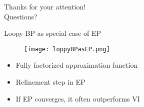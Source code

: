 \documentclass{beamer}
\begin{document}
\begin{frame}{}
	\centering
	Thanks for your attention!\\
	Questions?
\end{frame}

\begin{frame}{Loopy BP as special case of EP}
	\begin{figure}[h]
		\begin{center}
			\texttt{[image: loppyBPasEP.png]}
		\end{center}
	\end{figure}
	\begin{itemize}[<+->]
	\item Fully factorized approximation function
	\item Refinement step in EP
	\item If EP converges, it often outperforms VI
\end{itemize}
\end{frame}
\end{document}
